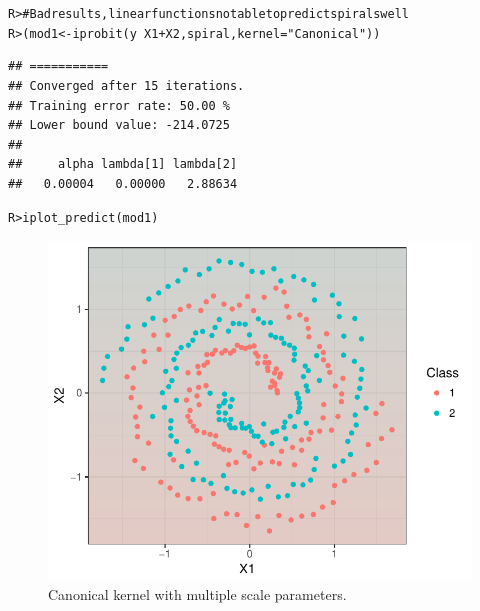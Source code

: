 \documentclass[a4paper,showframe,11pt]{report}\usepackage[]{graphicx}\usepackage[]{color}
\makeatletter
\newcommand{\hlstr}[1]{\textcolor[rgb]{0.063,0.58,0.627}{#1}}%
\newcommand{\hlcom}[1]{\textcolor[rgb]{0.588,0.588,0.588}{#1}}%
\newcommand{\hlopt}[1]{\textcolor[rgb]{0.196,0.196,0.196}{#1}}%
\newcommand{\hlstd}[1]{\textcolor[rgb]{0.196,0.196,0.196}{#1}}%
\newcommand{\hlkwb}[1]{\textcolor[rgb]{0.627,0,0.314}{#1}}%
\newcommand{\hlkwc}[1]{\textcolor[rgb]{0,0.631,0.314}{#1}}%
\newcommand{\hlkwd}[1]{\textcolor[rgb]{0.78,0.227,0.412}{#1}}%
\newenvironment{kframe}{%
 \def\at@end@of@kframe{}%
 \ifinner\ifhmode%
  \def\at@end@of@kframe{\end{minipage}}%
  \begin{minipage}{\columnwidth}%
 \fi\fi%
 \def\FrameCommand##1{\hskip\@totalleftmargin \hskip-\fboxsep
 \colorbox{shadecolor}{##1}\hskip-\fboxsep
     \hskip-\linewidth \hskip-\@totalleftmargin \hskip\columnwidth}%
 \MakeFramed {\advance\hsize-\width
   \@totalleftmargin\z@ \linewidth\hsize
   \@setminipage}}%
 {\par\unskip\endMakeFramed%
 \at@end@of@kframe}
\newenvironment{knitrout}{}{} %
\makeatother
\begin{document}
\begin{knitrout}
\color{fgcolor}\begin{kframe}
\begin{alltt}
\hlstd{R> }\hlcom{# Bad results, linear functions not able to predict spirals well}
\hlstd{R> }\hlstd{(mod1} \hlkwb{<-} \hlkwd{iprobit}\hlstd{(y} \hlopt{~} \hlstd{X1} \hlopt{+} \hlstd{X2, spiral,} \hlkwc{kernel} \hlstd{=} \hlstr{"Canonical"}\hlstd{))}
\end{alltt}
\begin{verbatim}
## ===========
## Converged after 15 iterations.
## Training error rate: 50.00 %
## Lower bound value: -214.0725 
## 
##     alpha lambda[1] lambda[2] 
##   0.00004   0.00000   2.88634
\end{verbatim}
\begin{alltt}
\hlstd{R> }\hlkwd{iplot_predict}\hlstd{(mod1)}
\end{alltt}
\end{kframe}\begin{figure}[h]

{\centering \includegraphics[width=0.7\linewidth]{figure/spiral_canonical-1} 

}

\caption[Canonical kernel with multiple scale parameters]{Canonical kernel with multiple scale parameters.}\label{fig:spiral_canonical}
\end{figure}


\end{knitrout}
\end{document}

